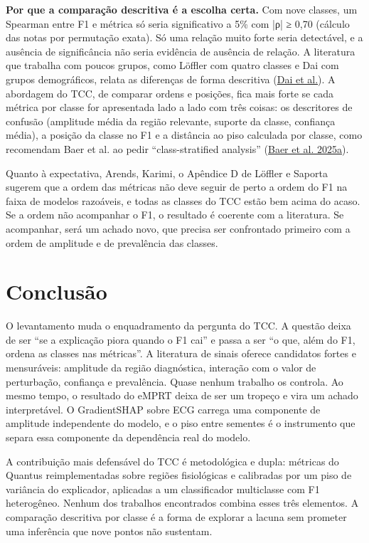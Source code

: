 \documentclass[11pt,a4paper]{article}
\begin{document}
\textbf{Por que a comparação descritiva é a escolha certa.} Com nove classes, um Spearman entre F1 e métrica só seria significativo a 5\% com |ρ| ≥ 0,70 (cálculo das notas por permutação exata). Só uma relação muito forte seria detectável, e a ausência de significância não seria evidência de ausência de relação. A literatura que trabalha com poucos grupos, como Löffler com quatro classes e Dai com grupos demográficos, relata as diferenças de forma descritiva (\href{https://arxiv.org/abs/2205.07277}{Dai et al.}). A abordagem do TCC, de comparar ordens e posições, fica mais forte se cada métrica por classe for apresentada lado a lado com três coisas: os descritores de confusão (amplitude média da região relevante, suporte da classe, confiança média), a posição da classe no F1 e a distância ao piso calculada por classe, como recomendam Baer et al. ao pedir ``class-stratified analysis'' (\href{https://arxiv.org/abs/2502.17022}{Baer et al. 2025a}).

Quanto à expectativa, Arends, Karimi, o Apêndice D de Löffler e Saporta sugerem que a ordem das métricas não deve seguir de perto a ordem do F1 na faixa de modelos razoáveis, e todas as classes do TCC estão bem acima do acaso. Se a ordem não acompanhar o F1, o resultado é coerente com a literatura. Se acompanhar, será um achado novo, que precisa ser confrontado primeiro com a ordem de amplitude e de prevalência das classes.



\section{Conclusão}

O levantamento muda o enquadramento da pergunta do TCC. A questão deixa de ser ``se a explicação piora quando o F1 cai'' e passa a ser ``o que, além do F1, ordena as classes nas métricas''. A literatura de sinais oferece candidatos fortes e mensuráveis: amplitude da região diagnóstica, interação com o valor de perturbação, confiança e prevalência. Quase nenhum trabalho os controla. Ao mesmo tempo, o resultado do eMPRT deixa de ser um tropeço e vira um achado interpretável. O GradientSHAP sobre ECG carrega uma componente de amplitude independente do modelo, e o piso entre sementes é o instrumento que separa essa componente da dependência real do modelo.

A contribuição mais defensável do TCC é metodológica e dupla: métricas do Quantus reimplementadas sobre regiões fisiológicas e calibradas por um piso de variância do explicador, aplicadas a um classificador multiclasse com F1 heterogêneo. Nenhum dos trabalhos encontrados combina esses três elementos. A comparação descritiva por classe é a forma de explorar a lacuna sem prometer uma inferência que nove pontos não sustentam.
\end{document}
